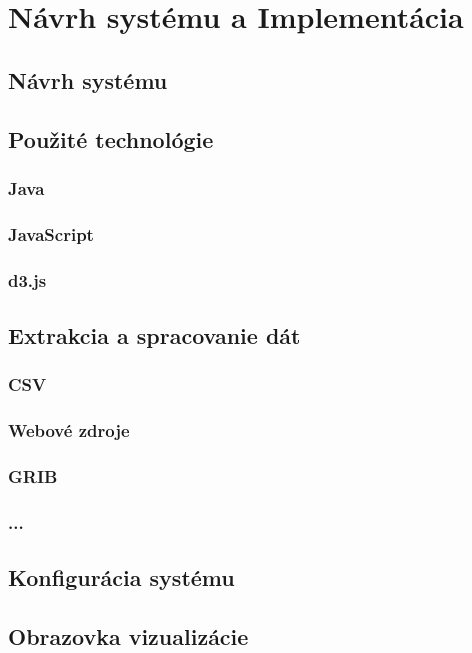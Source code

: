 \chapter{Návrh systému a Implementácia}

\section{Návrh systému}


\section{Použité technológie}

\subsection{Java}

\subsection{JavaScript}

\subsection{d3.js}



\section{Extrakcia a spracovanie dát}

\subsection{CSV}

\subsection{Webové zdroje}

\subsection{GRIB}

\subsection{...}

\section{Konfigurácia systému}


\section{Obrazovka vizualizácie}